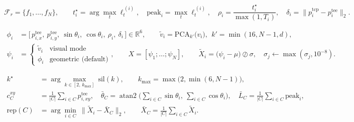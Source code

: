 \begin{equation}
\mathcal{F}_r=\{f_1,\dots,f_N\},
\qquad
t^\star_i=\arg\max_t \ell^{\,(i)}_t,\quad
\mathrm{peak}_i=\max_t \ell^{\,(i)}_t,\quad
\rho_i=\frac{t^\star_i}{\max(1,T_i)},\quad
\delta_i=\big\|p^{\mathrm{tcp}}_i-p^{\mathrm{tee}}_i\big\|_2.
\label{eq:perceive}
\end{equation}

\begin{align}
\phi_i&=\big[\,p^{\mathrm{tee}}_{i,x},\ p^{\mathrm{tee}}_{i,y},\ \sin\theta_i,\ \cos\theta_i,\ \rho_i,\ \delta_i\,\big]\in\mathbb{R}^6,
\qquad
\tilde v_i=\mathrm{PCA}_{k'}\big(v_i\big),\ \ k'=\min(16,N-1,d), \nonumber\\
\psi_i&=\begin{cases}\tilde v_i & \text{visual mode}\\[2pt]\phi_i & \text{geometric (default)}\end{cases},
\qquad
X=[\psi_1;\dots;\psi_N],\qquad
\tilde X_i=\big(\psi_i-\mu\big)\oslash\sigma,\quad \sigma_j\!\leftarrow\!\max(\sigma_j,10^{-8}).
\label{eq:phi}
\end{align}

\begin{align}
k^\star&=\arg\max_{k\in[2,\,k_{\max}]}\ \mathrm{sil}(k),\qquad k_{\max}=\max\!\big(2,\min(6,N-1)\big),\nonumber\\
c^{xy}_{C}&=\tfrac{1}{|C|}\!\sum_{i\in C}p^{\mathrm{tee}}_{i,xy},\quad
\bar\theta_{C}=\operatorname{atan2}\!\Big(\!\sum_{i\in C}\!\sin\theta_i,\ \sum_{i\in C}\!\cos\theta_i\Big),\quad
\bar L_{C}=\tfrac{1}{|C|}\!\sum_{i\in C}\mathrm{peak}_i,\nonumber\\
\mathrm{rep}(C)&=\arg\min_{i\in C}\ \big\|\tilde X_i-\bar X_{C}\big\|_2,\qquad
\bar X_{C}=\tfrac1{|C|}\!\sum_{i\in C}\tilde X_i.
\label{eq:partition}
\end{align}

